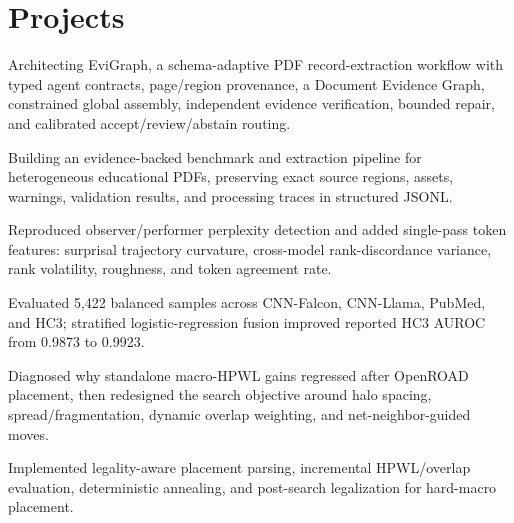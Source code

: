 \documentclass[a4paper,11pt]{article}
\begin{document}
\section{Projects}
\resumeSubHeadingListStart
{}
\resumeItemListStart
\item Architecting EviGraph, a schema-adaptive PDF record-extraction workflow with typed agent contracts, page/region provenance, a Document Evidence Graph, constrained global assembly, independent evidence verification, bounded repair, and calibrated accept/review/abstain routing.
\item Building an evidence-backed benchmark and extraction pipeline for heterogeneous educational PDFs, preserving exact source regions, assets, warnings, validation results, and processing traces in structured JSONL.
\resumeItemListEnd
{}
\resumeItemListStart
\item Reproduced observer/performer perplexity detection and added single-pass token features: surprisal trajectory curvature, cross-model rank-discordance variance, rank volatility, roughness, and token agreement rate.
\item Evaluated 5,422 balanced samples across CNN-Falcon, CNN-Llama, PubMed, and HC3; stratified logistic-regression fusion improved reported HC3 AUROC from 0.9873 to 0.9923.
\resumeItemListEnd
{}
\resumeItemListStart
\item Diagnosed why standalone macro-HPWL gains regressed after OpenROAD placement, then redesigned the search objective around halo spacing, spread/fragmentation, dynamic overlap weighting, and net-neighbor-guided moves.
\item Implemented legality-aware placement parsing, incremental HPWL/overlap evaluation, deterministic annealing, and post-search legalization for hard-macro placement.
\resumeItemListEnd
\resumeSubHeadingListEnd\vspace{-5pt}
\end{document}
